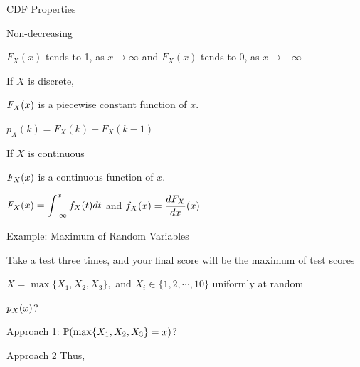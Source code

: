 \begin{frame}{CDF Properties}

\plitemsep 0.07in
\bci
\item<2-> Non-decreasing

\item<3-> $F_X(x)$ tends to 1, as $x \rightarrow \infty$ and $F_X(x)$ tends to 0, as $x \rightarrow -\infty$

\item<4-> If $X$ is discrete,
\bci
\item $F_X(x)$ is a piecewise constant function of $x.$
\item $p_X(k) = F_X(k) - F_X(k-1)$
\eci
\item<5-> If $X$ is continuous
\bci
\item $F_X(x)$ is a continuous function of $x.$
\item $\displaystyle F_X(x) = \int_{-\infty}^x f_X(t) dt$ and $\displaystyle f_X(x) = \frac{dF_X}{dx}(x)$
\eci


\eci
%
\end{frame}

\begin{frame}{Example: Maximum of Random Variables}

\plitemsep 0.07in
\bci
\item Take a test three times, and your final score will be the maximum of test scores

\item $X = \max\{X_1, X_2, X_3 \},$ and $X_i \in \{1, 2, \cdots, 10 \}$ uniformly at random
\item \question $p_X(x)$?

\item Approach 1: $\mathbb{P}( \max\{X_1, X_2, X_3 \} = x )$?
\item Approach 2
Thus,
\eci
\end{frame}


